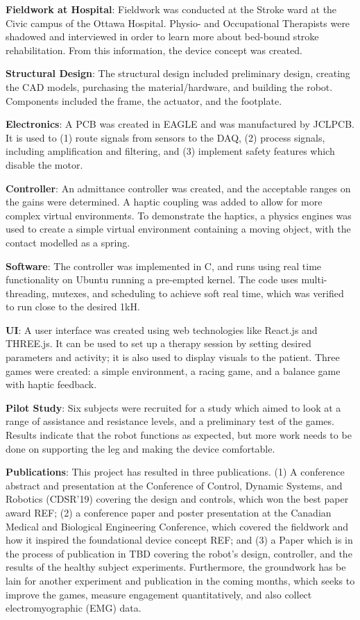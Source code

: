 \documentclass[12pt]{report}
\begin{document}
	\textbf{Fieldwork at Hospital}: Fieldwork was conducted at the Stroke ward at the Civic campus of the Ottawa Hospital. Physio- and Occupational Therapists were shadowed and interviewed in order to learn more about bed-bound stroke rehabilitation. From this information, the device concept was created.
	
	\textbf{Structural Design}: The structural design included preliminary design, creating the CAD models, purchasing the material/hardware, and building the robot. Components included the frame, the actuator, and the footplate. 
	
	\textbf{Electronics}: A PCB was created in EAGLE and was manufactured by JCLPCB. It is used to (1) route signals from sensors to the DAQ, (2) process signals, including amplification and filtering, and (3) implement safety features which disable the motor. 
	
	\textbf{Controller}: An admittance controller was created, and the acceptable ranges on the gains were determined. A haptic coupling was added to allow for more complex virtual environments. To demonstrate the haptics, a physics engines was used to create a simple virtual environment containing  a moving object, with the contact modelled as a spring.  
	
	\textbf{Software}: The controller was implemented in C, and runs using real time functionality on Ubuntu running a pre-empted kernel. The code uses multi-threading, mutexes, and scheduling to achieve soft real time, which was verified to run close to the desired 1kH. 
	
	\textbf{UI}: A user interface was created using web technologies like React.js and THREE.js. It can be used to set up a therapy session by setting desired parameters and activity; it is also used to display visuals to the patient. Three games were created: a simple environment, a racing game, and a balance game with haptic feedback. 
	
	\textbf{Pilot Study}: Six subjects were recruited for a study which aimed to look at a range of assistance and resistance levels, and a preliminary test of the games. Results indicate that the robot functions as expected, but more work needs to be done on supporting the leg and making the device comfortable. 
	
	\textbf{Publications}: This project has resulted in three publications. (1) A conference abstract and presentation at the Conference of Control, Dynamic Systems, and Robotics (CDSR'19) covering the design and controls, which won the best paper award REF; (2) a conference paper and poster presentation at the Canadian Medical and Biological Engineering Conference, which covered the fieldwork and how it inspired the foundational device concept REF; and (3) a Paper which is in the process of publication in TBD covering the robot's design, controller, and the results of the healthy subject experiments. Furthermore, the groundwork has be lain for another experiment and publication in the coming months, which seeks to improve the games, measure engagement quantitatively, and also collect electromyographic (EMG) data. 
	
\end{document}
